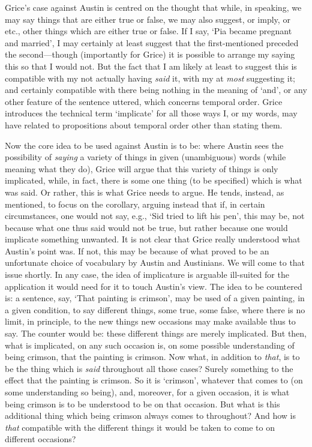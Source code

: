 Grice’s case against Austin is centred on the thought that while, in speaking, we may say things that are either true or false, we may also suggest, or imply, or etc., other things which are either true or false. If I say, ‘Pia became pregnant and married’, I may certainly at least suggest that the first-mentioned preceded the second---though (importantly for Grice) it is possible to arrange my saying this so that I would not. But the fact that I am likely at least to suggest this is compatible with my not actually having \emph{said} it, with my at \emph{most} suggesting it; and certainly compatible with there being nothing in the meaning of `and', or any other feature of the sentence uttered, which concerns temporal order. Grice introduces the technical term `implicate' for all those ways I, or my words, may have related to propositions about temporal order other than stating them.

Now the core idea to be used against Austin is to be: where Austin sees the possibility of \emph{saying} a variety of things in given (unambiguous) words (while meaning what they do), Grice will argue that this variety of things is only implicated, while, in fact, there is some one thing (to be specified) which is what was said. Or rather, this is what Grice needs to argue. He tends, instead, as mentioned, to focus on the corollary, arguing instead that if, in certain circumstances, one would not say, e.g., `Sid tried to lift his pen', this may be, not because what one thus said would not be true, but rather because one would implicate something unwanted. It is not clear that Grice really understood what Austin’s point was. If not, this may be because of what proved to be an unfortunate choice of vocabulary by Austin and Austinians. We will come to that issue shortly. In any case, the idea of implicature is arguable ill-suited for the application it would need for it to touch Austin’s view. The idea to be countered is: a sentence, say, `That painting is crimson', may be used of a given painting, in a given condition, to say different things, some true, some false, where there is no limit, in principle, to the new things new occasions may make available thus to say. The counter would be: these different things are merely implicated. But then, what is implicated, on any such occasion is, on some possible understanding of being crimson, that the painting is crimson. Now what, in addition to \emph{that}, is to be the thing which is \emph{said} throughout all those cases? Surely something to the effect that the painting is crimson. So it is `crimson', whatever that comes to (on some understanding so being), and, moreover, for a given occasion, it is what being crimson is to be understood to be on that occasion. But what is this additional thing which being crimson always comes to throughout? And how is \emph{that} compatible with the different things it would be taken to come to on different occasions?

